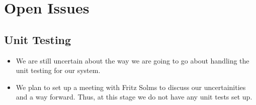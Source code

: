 \documentclass[11pt,fleqn]{book} %
\begin{document}


\chapter{Open Issues}

\section{Unit Testing}
	\begin{itemize}
		\item We are still uncertain about the way we are going to go about handling the unit testing for our system.
		\item We plan to set up a meeting with Fritz Solms to discuss our uncertainities and a way forward. Thus, at this stage we do not have any unit tests set up.
	\end{itemize}
\end{document}
